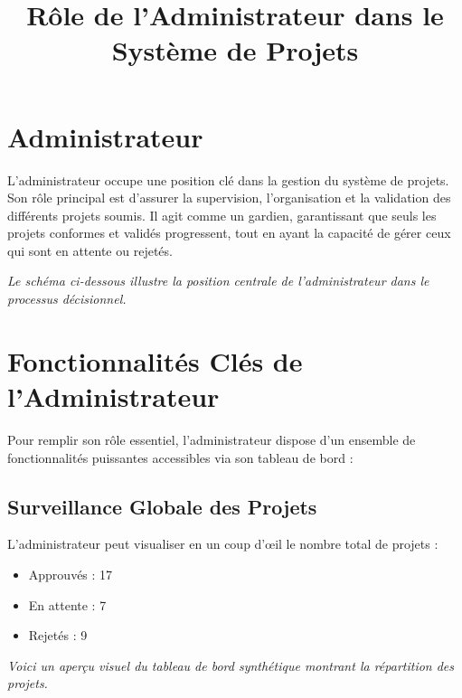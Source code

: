 \documentclass[12pt]{article}
\title{Rôle de l'Administrateur dans le Système de Projets}
\author{}
\date{}
\begin{document}
\maketitle

\section{Administrateur}

L’administrateur occupe une position clé dans la gestion du système de projets. Son rôle principal est d'assurer la supervision, l'organisation et la validation des différents projets soumis. Il agit comme un gardien, garantissant que seuls les projets conformes et validés progressent, tout en ayant la capacité de gérer ceux qui sont en attente ou rejetés.


\vspace{0.5cm}
\textit{Le schéma ci-dessous illustre la position centrale de l’administrateur dans le processus décisionnel.}
\vspace{0.5cm}

\section{Fonctionnalités Clés de l'Administrateur}

Pour remplir son rôle essentiel, l'administrateur dispose d'un ensemble de fonctionnalités puissantes accessibles via son tableau de bord :

\subsection{Surveillance Globale des Projets}

L'administrateur peut visualiser en un coup d'œil le nombre total de projets :
\begin{itemize}
    \item Approuvés : 17
    \item En attente : 7
    \item Rejetés : 9
\end{itemize}


\vspace{0.5cm}
\textit{Voici un aperçu visuel du tableau de bord synthétique montrant la répartition des projets.}
\vspace{0.5cm}
\end{document}
